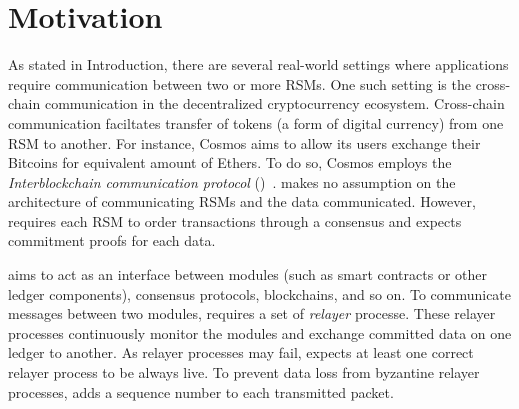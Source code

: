 \section{Motivation}
As stated in Introduction, there are several real-world settings where applications 
require communication between two or more RSMs. 
One such setting is the cross-chain communication in the decentralized cryptocurrency ecosystem.
Cross-chain communication faciltates transfer of tokens (a form of digital currency) from 
one RSM to another. 
For instance, Cosmos aims to allow its users exchange their Bitcoins for equivalent amount of Ethers.
To do so, Cosmos employs the {\em Interblockchain communication protocol} (\IBC{})~\cite{ibc}.
\IBC{} makes no assumption on the architecture of communicating RSMs and the data communicated.
However, \IBC{} requires each RSM to order transactions through a \BFT{} consensus and 
expects commitment proofs for each data.

\IBC{} aims to act as an interface between modules (such as smart contracts or other ledger components), 
consensus protocols, blockchains, and so on.
To communicate messages between two modules, \IBC{} requires a set of {\em relayer} processe.
These relayer processes continuously monitor the modules and exchange committed data on one ledger to another.
As relayer processes may fail, \IBC{} expects at least one correct relayer process to be always live.
To prevent data loss from byzantine relayer processes, \IBC{} adds a sequence number to each transmitted packet. 


